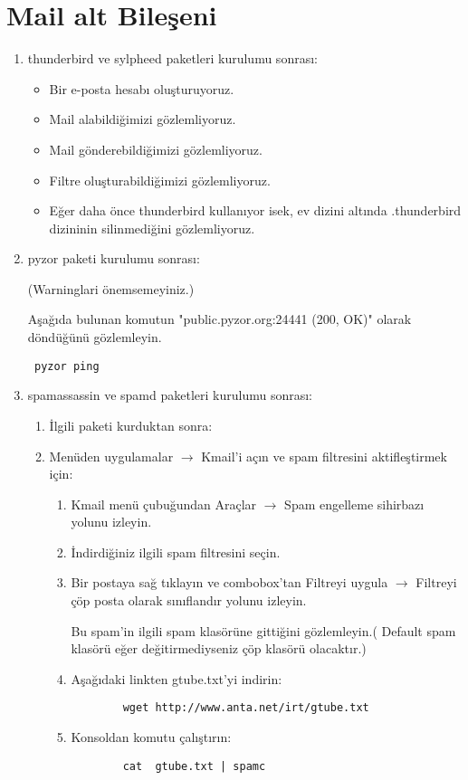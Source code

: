 \documentclass[a4paper,10pt]{article}
\begin{document}
\section{Mail alt Bileşeni}
\begin{enumerate}
 \item thunderbird ve sylpheed paketleri kurulumu sonrası:
\begin{itemize}
\item Bir e-posta hesabı oluşturuyoruz.
\item Mail alabildiğimizi gözlemliyoruz.
\item Mail gönderebildiğimizi gözlemliyoruz.
\item Filtre oluşturabildiğimizi gözlemliyoruz.
\item Eğer daha önce thunderbird kullanıyor isek, ev dizini altında .thunderbird dizininin silinmediğini gözlemliyoruz.
\end{itemize}
\item pyzor paketi kurulumu sonrası:

(Warninglari önemsemeyiniz.)

Aşağıda bulunan komutun "public.pyzor.org:24441 (200, OK)" olarak döndüğünü gözlemleyin.
\begin{verbatim}
 pyzor ping
\end{verbatim}

 \item spamassassin ve spamd paketleri kurulumu sonrası:
\begin{enumerate}
	\item İlgili paketi kurduktan sonra:
	\item Menüden uygulamalar $\rightarrow$ Kmail'i açın ve spam filtresini aktifleştirmek için:
		
	\begin{enumerate}
		\item Kmail menü çubuğundan Araçlar $\rightarrow$  Spam engelleme sihirbazı yolunu izleyin.
		\item İndirdiğiniz ilgili spam filtresini seçin.
		\item Bir postaya sağ tıklayın ve combobox'tan Filtreyi uygula $\rightarrow$ Filtreyi çöp posta olarak sınıflandır yolunu izleyin.

		Bu spam'in ilgili spam klasörüne gittiğini gözlemleyin.( Default spam klasörü eğer değitirmediyseniz çöp klasörü olacaktır.)

		\item Aşağıdaki linkten gtube.txt'yi indirin: 
		\begin{verbatim}
 		wget http://www.anta.net/irt/gtube.txt
		\end{verbatim}
		\item  Konsoldan komutu çalıştırın:
		\begin{verbatim}
 		cat  gtube.txt | spamc 
		\end{verbatim}
		

\end{enumerate}
\end{enumerate}
\end{enumerate}
\end{document}

